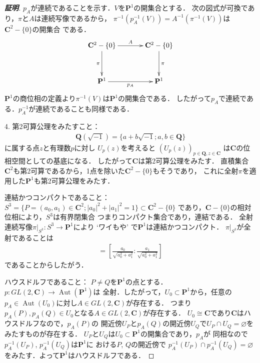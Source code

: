 \documentclass[11pt, a4paper, dvipdfmx, draft]{jsarticle}
\theoremstyle{definition}
\newcommand{\qq}{\mathbf{Q}}
\newcommand{\cc}{\mathbf{C}}
\newcommand{\pp}{\mathbf{P}}
\newcommand{\Aut}{\mathop{\mathrm{Aut}}\nolimits}
\newcommand{\emp}{\varnothing}
\newcommand{\mapres}[2]{\left. #1 \right|_{#2}}
\theoremstyle{mystyle}
\numberwithin{equation}{section} %
\begin{document}
\begin{proof}[\textbf{証明}]
    $p_A$が連続であることを示す．$V$を$\pp^1$の開集合とする．
    次の図式が可換であり，$\pi$と$A$は連続写像であるから，
    $\pi^{-1}\left(p_A^{-1}(V)\right)
    =A^{-1}\left(\pi^{-1}(V)\right)$は$\cc^2-\{0\}$の開集合
    である．
    \begin{equation*}
        \vcenter{\xymatrix@C=36pt@R=36pt{
        \cc^2-\{0\} 
        \ar@{{}->}[d]_{\pi} 
        \ar@{{}->}[r]^-{A} 
        & \cc^2-\{0\} 
        \ar@{{}->}[d]^{\pi} 
        \\
        \pp^1 \ar[r]_{p_A}  
        & \pp^1 \ar@{}[lu]
        }}
    \end{equation*}
    $\pp^{1}$の商位相の定義より$\pi^{-1}(V)$は$\pp^{1}$の開集合である．
    したがって$p_A$で連続である．$p_A^{-1}$が連続であることも同様である．

    4. 
    第2可算公理をみたすこと：
    \begin{align*}
        \qq(\sqrt{-1})=\{a+b\sqrt{-1};a,b\in\qq\}
    \end{align*}
    に属する点$z$と有理数$p$に対し
    $U_{p}(z)$を考えると
    $\left(U_{p}(z)\right)_{p\in\qq,z\in\cc}$
    は$\cc$の位相空間としての基底になる．
    したがって$\cc$は第2可算公理をみたす．
    直積集合$\cc^2$も第2可算であるから，1点を除いた$\cc^2-\{0\}$もそうであり，
    これに全射$\pi$を適用した$\pp^1$も第2可算公理をみたす．

    連結かつコンパクトであること：
    $S^3=\{P=(a_0,a_1)\in\cc^2;|a_0|^2+|a_1|^2=1\}\subset\cc^2-\{0\}$
    であり，$\cc-\{0\}$の相対位相により，$S^3$は有界閉集合
    つまりコンパクト集合であり，連結である．
    全射連続写像$\mapres{\pi}{S^3}\colon S^3\to\pp^1$により 
    `ワイもや' で$\pp^1$は連結かつコンパクト．
    $\mapres{\pi}{S^3}$が全射であることは
    \begin{align*}
        [a_0\colon a_1]
        =
        \left[
            \frac{a_0}{\sqrt{a_0^2+a_1^2}}\colon \frac{a_1}{\sqrt{a_0^2+a_1^2}}
        \right]
    \end{align*}
    であることからしたがう．

    ハウスドルフであること：
    $P\neq Q$を$\pp^1$の点とする．
    $p\colon GL(2,\cc)\to \Aut(\pp^1)$は
    全射．したがって，$U_0\subset \pp^1$から，任意の
    $p_{A}\in \Aut(U_0)$に対し$A\in GL(2,\cc)$が存在する．
    つまり$p_A(P),p_A(Q)\in U_0$となる$A\in GL(2,\cc)$が存在する．
    $U_0\cong \cc$であり$\cc$はハウスドルフなので，$p_A(P)$の
    開近傍$U_P$と$p_A(Q)$の開近傍$U_Q$で$U_P\cap U_Q=\emp$を
    みたすものが存在する．
    $U_P$と$U_Q$は$U_0\subset\pp^1$の開集合であり，$p_{A}$が
    同相なので$p_A^{-1}(U_P)$, $p_A^{-1}(U_Q)$は$\pp^1$に
    おける$P$, $Q$の開近傍で
    $p_A^{-1}(U_P)\cap p_A^{-1}(U_Q)=\emp$
    をみたす．よって$\pp^1$はハウスドルフである．
\end{proof}
\end{document}
